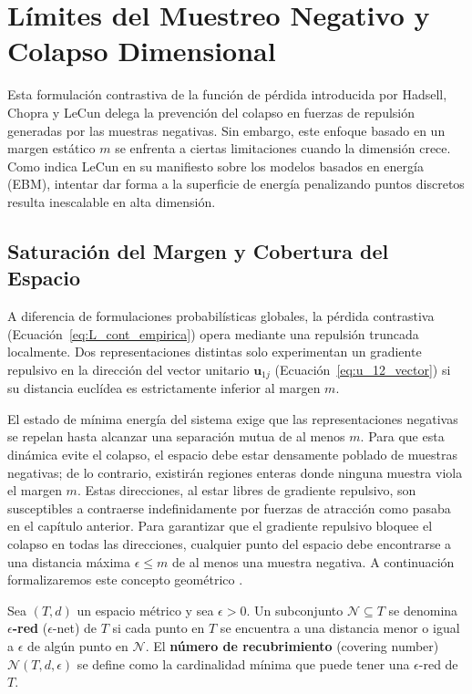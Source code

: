\section{Límites del Muestreo Negativo y Colapso Dimensional}
\label{sec:limites_negativos}

Esta formulación contrastiva de la función de pérdida introducida por Hadsell, Chopra y LeCun \cite{hadsell2006dimensionality} delega la prevención del colapso en fuerzas de repulsión generadas por las muestras negativas. Sin embargo, este enfoque basado en un margen estático $m$ se enfrenta a ciertas limitaciones cuando la dimensión crece. Como indica LeCun \cite{lecun2022path} en su manifiesto sobre los modelos basados en energía (EBM), intentar dar forma a la superficie de energía penalizando puntos discretos resulta inescalable en alta dimensión.

\subsection{Saturación del Margen y Cobertura del Espacio}

A diferencia de formulaciones probabilísticas globales, la pérdida contrastiva (Ecuación~\ref{eq:L_cont_empirica}) opera mediante una repulsión truncada localmente. Dos representaciones distintas solo experimentan un gradiente repulsivo en la dirección del vector unitario $\mathbf{u}_{1j}$ (Ecuación~\ref{eq:u_12_vector}) si su distancia euclídea es estrictamente inferior al margen $m$.

El estado de mínima energía del sistema exige que las representaciones negativas se repelan hasta alcanzar una separación mutua de al menos $m$. Para que esta dinámica evite el colapso, el espacio debe estar densamente poblado de muestras negativas; de lo contrario, existirán regiones enteras donde ninguna muestra viola el margen $m$. Estas direcciones, al estar libres de gradiente repulsivo, son susceptibles a contraerse indefinidamente por fuerzas de atracción como pasaba en el capítulo anterior. Para garantizar que el gradiente repulsivo bloquee el colapso en todas las direcciones, cualquier punto del espacio debe encontrarse a una distancia máxima $\epsilon \le m$ de al menos una muestra negativa. A continuación formalizaremos este concepto geométrico \cite{vershynin2018high}.

\begin{definition}
Sea $(T, d)$ un espacio métrico y sea $\epsilon > 0$. Un subconjunto $\mathcal{N} \subseteq T$ se denomina \textbf{$\epsilon$-red} ($\epsilon$-net) de $T$ si cada punto en $T$ se encuentra a una distancia menor o igual a $\epsilon$ de algún punto en $\mathcal{N}$. El \textbf{número de recubrimiento} (covering number) $\mathcal{N}(T, d, \epsilon)$ se define como la cardinalidad mínima que puede tener una $\epsilon$-red de $T$.
\end{definition}

